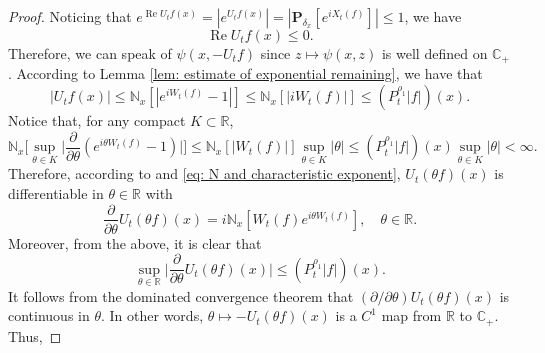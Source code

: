 \documentclass[EJP]{ejpecp} %
\begin{document}
\begin{proof}
	Noticing that $ e^{\operatorname{Re} U_tf(x)} = |e^{U_tf(x)}| = |\mathbf P_{\delta_x}[e^{i X_t(f)}]| \leq 1$, we have
\begin{equation}
\label{eq: -v has positive real part}
	\operatorname{Re} U_tf(x)
    \leq 0.
\end{equation}
	Therefore, we can speak of $\psi(x,-U_tf)$ since $z\mapsto \psi(x,z)$ is well defined on $\mathbb C_+$.
	According to Lemma \ref{lem: estimate of exponential remaining}, we have that
\begin{equation}
\label{eq: upper bound for vf}
    |U_tf(x)|
    \leq \mathbb N_x[|e^{i W_t(f)} - 1|]
    \leq \mathbb N_x[|i W_t(f)|]
    \leq (P^{\rho_1}_t |f|)(x).
\end{equation}
Notice that, for any compact $K \subset \mathbb R$,
\begin{equation}
\label{eq: estimate of deriavetive of v(theta)}
    \mathbb N_x \Big[\sup_{\theta \in K} \Big|\frac{\partial}{\partial \theta} (e^{i\theta W_t(f)} - 1) \Big|\Big]
    \leq \mathbb N_x[|W_t(f)|] \sup_{\theta \in K}|\theta|
    \leq (P^{\rho_1}_t |f|)(x) \sup_{\theta \in K}|\theta| < \infty.
\end{equation}
	Therefore, according to \cite[Theorem A.5.2]{Durrett2010Probability} and \eqref{eq: N and characteristic exponent}, $ U_t( \theta f)( x )$ is differentiable in $\theta \in \mathbb R$ with
\[
    \frac{\partial}{\partial \theta} U_t(\theta f)(x)
    = i\mathbb N_x[W_t(f) e^{i\theta W_t(f)}],
    \quad \theta \in \mathbb R.
\]
	Moreover, from the above, it is clear that
\begin{equation}
\label{eq: upper bounded for derivative of v(theta)}
	\sup_{\theta \in \mathbb R}\Big| \frac{\partial}{\partial \theta}U_t(\theta f)(x)\Big|
    \leq ( P^{\rho_1}_t |f|)(x).
\end{equation}
	It follows from the dominated convergence theorem that $(\partial/\partial \theta)U_t(\theta f)(x)$ is continuous in $\theta$.
	In other words, $\theta \mapsto -U_t(\theta f)(x)$ is a $C^1$ map from $\mathbb R$ to $\mathbb C_+$.
	Thus,

\end{proof}
\end{document}
